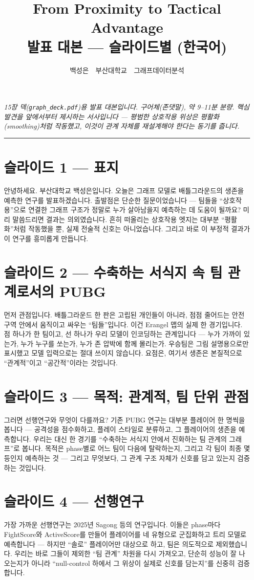 \documentclass[11pt]{article}
\title{\textbf{From Proximity to Tactical Advantage}\\[2pt]
\large 발표 대본 --- 슬라이드별 (한국어)}
\author{백성은 \,\textbar\, 부산대학교 \,\textbar\, 그래프데이터분석}
\date{}
\begin{document}
\maketitle
\noindent\textit{15장 덱(\texttt{graph\_deck.pdf})용 발표 대본입니다. 구어체(존댓말), 약 9{--}11분 분량. 핵심 발견을 앞에서부터 제시하는 서사입니다 --- 평범한 상호작용 위상은 평활화(smoothing)처럼 작동했고, 이것이 관계 자체를 재설계해야 한다는 동기를 줍니다.}
\vspace{0.5em}\hrule

\section{슬라이드 1 --- 표지}
안녕하세요. 부산대학교 백성은입니다. 오늘은 그래프 모델로 배틀그라운드의 생존을 예측한 연구를 발표하겠습니다. 출발점은 단순한 질문이었습니다 --- 팀들을 ``상호작용''으로 연결한 그래프 구조가 정말로 누가 살아남을지 예측하는 데 도움이 될까요? 미리 말씀드리면 결과는 의외였습니다. 흔히 떠올리는 상호작용 엣지는 대부분 ``평활화''처럼 작동했을 뿐, 실제 전술적 신호는 아니었습니다. 그리고 바로 이 부정적 결과가 이 연구를 흥미롭게 만듭니다.

\section{슬라이드 2 --- 수축하는 서식지 속 팀 관계로서의 PUBG}
먼저 관점입니다. 배틀그라운드 한 판은 고립된 개인들이 아니라, 점점 줄어드는 안전구역 안에서 움직이고 싸우는 ``팀들''입니다. 이건 Erangel 맵의 실제 한 경기입니다. 점 하나가 한 팀이고, 선 하나가 우리 모델이 인코딩하는 관계입니다 --- 누가 가까이 있는가, 누가 누구를 쏘는가, 누가 존 압박에 함께 몰리는가. 우승팀은 그림 설명용으로만 표시했고 모델 입력으로는 절대 쓰이지 않습니다. 요점은, 여기서 생존은 본질적으로 ``관계적''이고 ``공간적''이라는 것입니다.

\section{슬라이드 3 --- 목적: 관계적, 팀 단위 관점}
그러면 선행연구와 무엇이 다를까요? 기존 PUBG 연구는 대부분 플레이어 한 명씩을 봅니다 --- 공격성을 점수화하고, 플레이 스타일로 분류하고, 그 플레이어의 생존을 예측합니다. 우리는 대신 한 경기를 ``수축하는 서식지 안에서 진화하는 팀 관계의 그래프''로 봅니다. 목적은 phase별로 어느 팀이 다음에 탈락하는지, 그리고 각 팀이 최종 몇 등인지 예측하는 것 --- 그리고 무엇보다, 그 관계 구조 자체가 신호를 담고 있는지 검증하는 것입니다.

\section{슬라이드 4 --- 선행연구}
가장 가까운 선행연구는 2025년 Sagong 등의 연구입니다. 이들은 phase마다 FightScore와 ActiveScore를 만들어 플레이어를 네 유형으로 군집화하고 트리 모델로 예측합니다 --- 하지만 ``솔로'' 플레이어만 대상으로 하고, 팀은 의도적으로 제외했습니다. 우리는 바로 그들이 제외한 ``팀 관계'' 차원을 다시 가져오고, 단순히 성능이 잘 나오는지가 아니라 ``null-control 하에서 그 위상이 실제로 신호를 담는지''를 신중히 검증합니다.
\end{document}
